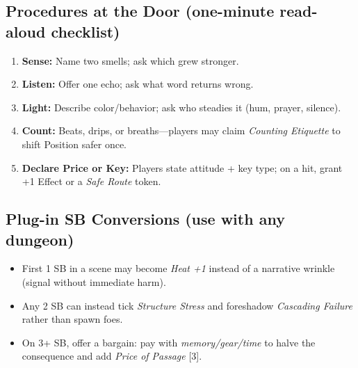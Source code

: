 \subsection*{Procedures at the Door (one-minute read-aloud checklist)}
\begin{enumerate}
  \item \textbf{Sense:} Name two smells; ask which grew stronger.
  \item \textbf{Listen:} Offer one echo; ask what word returns wrong.
  \item \textbf{Light:} Describe color/behavior; ask who steadies it (hum, prayer, silence).
  \item \textbf{Count:} Beats, drips, or breaths—players may claim \emph{Counting Etiquette} to shift Position safer once.
  \item \textbf{Declare Price or Key:} Players state attitude + key type; on a hit, grant +1 Effect or a \emph{Safe Route} token.
\end{enumerate}

\subsection*{Plug-in SB Conversions (use with any dungeon)}
\begin{itemize}
  \item First 1 SB in a scene may become \emph{Heat +1} instead of a narrative wrinkle (signal without immediate harm).
  \item Any 2 SB can instead tick \emph{Structure Stress} and foreshadow \emph{Cascading Failure} rather than spawn foes.
  \item On 3+ SB, offer a bargain: pay with \emph{memory/gear/time} to halve the consequence and add \emph{Price of Passage} [3].
\end{itemize}